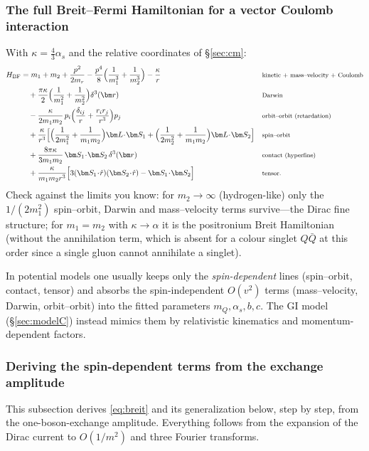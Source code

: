 \documentclass[11pt,a4paper]{article}
\numberwithin{equation}{section}
\theoremstyle{definition}
\theoremstyle{plain}
\theoremstyle{remark}
\numberwithin{algorithm}{section}
\newcommand{\vr}{\bm r}
\newcommand{\vL}{\bm L}
\newcommand{\vS}{\bm S}
\newcommand{\as}{\alpha_s}
\newcommand{\mr}{m_r}
\begin{document}
\subsubsection{The full Breit--Fermi Hamiltonian for a vector Coulomb interaction}
With $\kappa=\frac43\as$ and the relative coordinates of \S\ref{sec:cm}:
\begin{align}
H_{\rm BF}&=m_1+m_2+\frac{p^2}{2\mr}-\frac{p^4}{8}\Big(\frac1{m_1^3}+\frac1{m_2^3}\Big)-\frac{\kappa}{r}
&&\text{\footnotesize kinetic + mass--velocity + Coulomb}\nonumber\\
&\quad+\frac{\pi\kappa}{2}\Big(\frac1{m_1^2}+\frac1{m_2^2}\Big)\delta^3(\vr)
&&\text{\footnotesize Darwin}\nonumber\\
&\quad-\frac{\kappa}{2m_1m_2}\,p_i\Big(\frac{\delta_{ij}}{r}+\frac{r_ir_j}{r^3}\Big)p_j
&&\text{\footnotesize orbit--orbit (retardation)}\nonumber\\
&\quad+\frac{\kappa}{r^3}\Big[\Big(\frac1{2m_1^2}+\frac1{m_1m_2}\Big)\vL\!\cdot\!\vS_1+\Big(\frac1{2m_2^2}+\frac1{m_1m_2}\Big)\vL\!\cdot\!\vS_2\Big]
&&\text{\footnotesize spin--orbit}\nonumber\\
&\quad+\frac{8\pi\kappa}{3m_1m_2}\,\vS_1\!\cdot\!\vS_2\,\delta^3(\vr)
&&\text{\footnotesize contact (hyperfine)}\nonumber\\
&\quad+\frac{\kappa}{m_1m_2r^3}\Big[3(\vS_1\!\cdot\!\hat r)(\vS_2\!\cdot\!\hat r)-\vS_1\!\cdot\!\vS_2\Big]
&&\text{\footnotesize tensor.}
\label{eq:breit}
\end{align}
Check against the limits you know: for $m_2\to\infty$ (hydrogen-like) only the $1/(2m_1^2)$ spin--orbit, Darwin and mass--velocity terms survive---the Dirac fine structure; for $m_1=m_2$ with $\kappa\to\alpha$ it is the positronium Breit Hamiltonian (without the annihilation term, which is absent for a colour singlet $Q\bar Q$ at this order since a single gluon cannot annihilate a singlet).

In potential models one usually keeps only the \emph{spin-dependent} lines (spin--orbit, contact, tensor) and absorbs the spin-independent $O(v^2)$ terms (mass--velocity, Darwin, orbit--orbit) into the fitted parameters $m_Q,\as,b,c$. The GI model (\S\ref{sec:modelC}) instead mimics them by relativistic kinematics and momentum-dependent factors.

\subsubsection{Deriving the spin-dependent terms from the exchange amplitude}\label{sec:BFderiv}
This subsection derives \eqref{eq:breit} and its generalization below, step by step, from the one-boson-exchange amplitude. Everything follows from the expansion of the Dirac current to $O(1/m^2)$ and three Fourier transforms.
\end{document}
